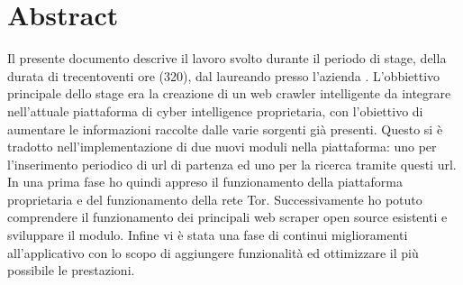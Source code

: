 
\cleardoublepage
{}
{}
\begingroup
\let\clearpage\relax
\let\cleardoublepage\relax
\let\cleardoublepage\relax

\chapter*{Abstract}

Il presente documento descrive il lavoro svolto durante il periodo di stage, della durata di trecentoventi ore (320), dal laureando \myName{} presso l'azienda \myCompany{} \myCompanyRag{}.
L'obbiettivo principale dello stage era la creazione di un web crawler intelligente da integrare nell’attuale piattaforma
di cyber intelligence proprietaria, con l’obiettivo di aumentare le informazioni raccolte dalle varie
sorgenti già presenti. Questo si è tradotto nell'implementazione di due nuovi moduli nella piattaforma: uno per l'inserimento periodico di url di partenza ed uno per la ricerca tramite questi url. \newline{}
In una prima fase ho quindi appreso il funzionamento della piattaforma proprietaria e del funzionamento della rete Tor. Successivamente ho potuto comprendere il funzionamento dei principali web scraper open source esistenti e sviluppare il modulo. Infine vi è stata una fase di continui miglioramenti all'applicativo con lo scopo di aggiungere funzionalità ed ottimizzare il più possibile le prestazioni.

%
%

\endgroup			

\vfill


